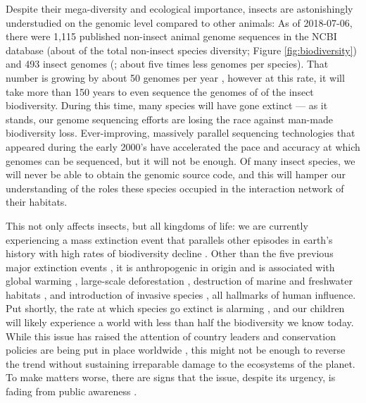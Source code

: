 Despite their mega-diversity and ecological importance, insects are
astonishingly understudied on the genomic level compared to other
animals: As of 2018-07-06, there were 1,115 published non-insect animal
genome sequences in the NCBI database \citep{OLeary2016} (about 
of the total non-insect species diversity; Figure
\ref{fig:biodiversity}) and 493 insect genomes (; about five
times less genomes per species).  That number is growing by about 50
genomes per year \citep{OLeary2016}, however at this rate, it will take
more than 150 years to even sequence the genomes of  of the insect
biodiversity.  During this time, many species will have gone extinct ---
as it stands, our genome sequencing efforts are losing the race against
man-made biodiversity loss. Ever-improving, massively parallel
sequencing technologies that appeared during the early 2000's
\citep{Behjati2013} have accelerated the pace and accuracy at which
genomes can be sequenced, but it will not be enough. Of many insect
species, we will never be able to obtain the genomic source code, and
this will hamper our understanding of the roles these species occupied
in the interaction network of their habitats.

\label{mass-extinction}%
This not only affects insects, but all kingdoms of life: we are
currently experiencing a mass extinction event that parallels other
episodes in earth's history with high rates of biodiversity decline
\citep{Pimm1995, Dirzo2003, Schipper2008, Barnosky2011, Dirzo2014}.
Other than the five previous major extinction events
\citep{Kolbert2014}, it is anthropogenic in origin \citep{Leakey1996,
Ceballos2015} and is associated with global warming \citep{Cook2016,
Wuebbles2017}, large-scale deforestation \citep{Wright2005}, destruction
of marine and freshwater habitats \citep{Burkhead2012}, and introduction
of invasive species \citep{Mooney2001}, all hallmarks of human
influence. Put shortly, the rate at which species go extinct is alarming
\citep{Newbold2016, Ceballos2017, Hallmann2017}, and our children will
likely experience a world with less than half the biodiversity we know
today. While this issue has raised the attention of country leaders and
conservation policies are being put in place worldwide
\citep{Puntaru2017}, this might not be enough to reverse the trend
without sustaining irreparable damage to the ecosystems of the planet.
To make matters worse, there are signs that the issue, despite its
urgency, is fading from public awareness \citep{Kusmanoff2017}. 

